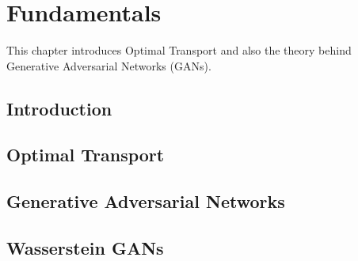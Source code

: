 \chapter{Fundamentals}
\label{chp:fundamentals}

This chapter introduces Optimal Transport and also the theory behind Generative Adversarial Networks (GANs).

\section{Introduction}


\section{Optimal Transport}


\section{Generative Adversarial Networks}


\section{Wasserstein GANs}


